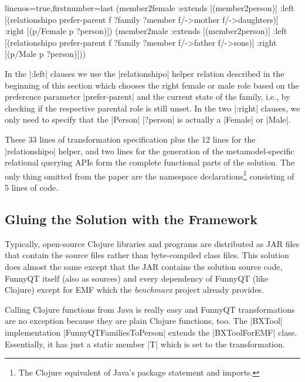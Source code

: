\documentclass[a4paper]{article}
\newcommand{\code}{\clojureinline}
\begin{document}
\begin{clojurecode*}{linenos=true,firstnumber=last}
  (member2female
   :extends [(member2person)]
   :left  [(relationshipo prefer-parent f ?family ?member f/->mother f/->daughters)]
   :right [(p/Female p ?person)])
  (member2male
   :extends [(member2person)]
   :left  [(relationshipo prefer-parent f ?family ?member f/->father f/->sons)]
   :right [(p/Male p ?person)]))
\end{clojurecode*}

In the \code|:left| clauses we use the \code|relationshipo| helper relation
described in the beginning of this section which chooses the right female or
male role based on the preference parameter \code|prefer-parent| and the
current state of the family, i.e., by checking if the respective parental role
is still unset.  In the two \code|:right| clauses, we only need to specify that
the \code|Person| \code|?person| is actually a \code|Female| or \code|Male|.

These 33 lines of transformation specification plus the 12 lines for the
\code|relationshipo| helper, and two lines for the generation of the
metamodel-specific relational querying APIs form the complete functional parts
of the solution.  The only thing omitted from the paper are the namespace
declarations\footnote{The Clojure equivalent of Java's package statement and
  imports.}  consisting of 5 lines of code.


\subsection{Gluing the Solution with the Framework}
\label{sec:gluing}

Typically, open-source Clojure libraries and programs are distributed as JAR
files that contain the source files rather than byte-compiled class files.
This solution does almost the same except that the JAR contains the solution
source code, FunnyQT itself (also as sources) and every dependency of FunnyQT
(like Clojure) except for EMF which the \emph{benchmarx} project already
provides.

Calling Clojure functions from Java is really easy and FunnyQT transformations
are no exception because they are plain Clojure functions, too.  The
\code|BXTool| implementation \code|FunnyQTFamiliesToPerson| extends the
\code|BXToolForEMF| class.  Essentially, it has just a static member \code|T|
which is set to the transformation.
\end{document}
